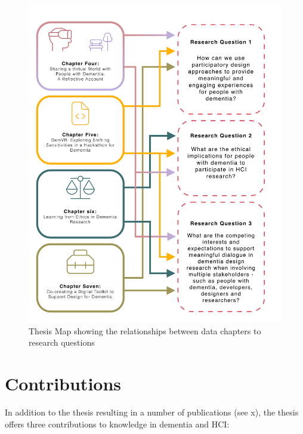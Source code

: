 \label{Intro:Thesis Map}
\begin{figure}[htp]
\centering
\includegraphics[width=.8\linewidth]{Images/Thesis_Narrative/RQ_and_Chapters.png}
\caption{Thesis Map showing the relationships between data chapters to research questions}
\label{fig:RQ_and_Chapters}
\end{figure}


\section{Contributions}
\label{Intro:Contribution}
In addition to the thesis resulting in a number of publications (see x), the thesis offers three contributions to knowledge in dementia and HCI:

